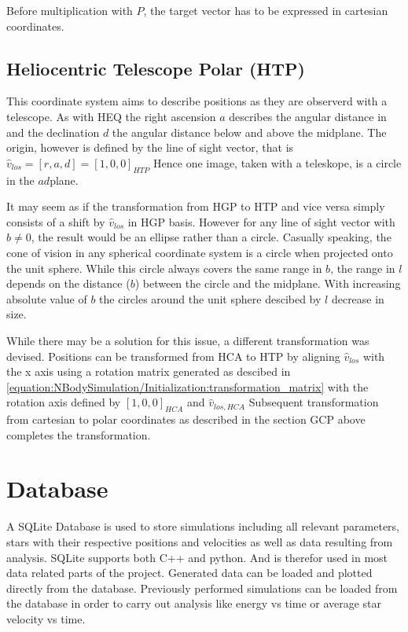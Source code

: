 \documentclass[letterpaper,10pt,english]{sphinxmanual}
\begin{document}
\sphinxAtStartPar
Before multiplication with \(P\), the target vector has to be expressed in cartesian coordinates.


\section{Heliocentric Telescope Polar (HTP)}
\label{\detokenize{NBodySimulation/CoordinateSystems:heliocentric-telescope-polar-htp}}
\sphinxAtStartPar
This coordinate system aims to describe positions as they are observerd with a telescope.
As with HEQ the right ascension \(a\) describes the angular distance in and the declination \(d\) the angular distance below and above the midplane.
The origin, however is defined by the line of sight vector, that is \(\hat{v}_{los} = [r,a,d] = [1,0,0]_{HTP}\)
Hence one image, taken with a teleskope, is a circle in the \(ad\)\sphinxhyphen{}plane.

\sphinxAtStartPar
It may seem as if the transformation from HGP to HTP and vice versa simply consists of a shift by \(\hat{v}_{los}\) in HGP basis.
However for any line of sight vector with \(b\neq0\), the result would be an ellipse rather than a circle.
Casually speaking, the cone of vision in any spherical coordinate system is a circle when projected onto the unit sphere.
While this circle always covers the same range in \(b\), the range in \(l\) depends on the distance (\(b\)) between the circle and the midplane.
With increasing absolute value of \(b\) the circles around the unit sphere descibed by \(l\) decrease in size.

\sphinxAtStartPar
While there may be a solution for this issue, a different transformation was devised.
Positions can be transformed from HCA to HTP by aligning \(\hat{v}_{los}\) with the x axis 
using a rotation matrix generated as descibed in \eqref{equation:NBodySimulation/Initialization:transformation_matrix} with the rotation axis defined by \([1,0,0]_{HCA}\) and \(\hat{v}_{los,HCA}\)
Subsequent transformation from cartesian to polar coordinates as described in the section GCP above completes the transformation.


\chapter{Database}
\label{\detokenize{NBodySimulation/Database:database}}\label{\detokenize{NBodySimulation/Database::doc}}
\sphinxAtStartPar
A SQLite Database is used to store simulations including all relevant parameters, stars with their respective positions and velocities as well as data resulting from analysis.
SQLite supports both C++ and python. And is therefor used in most data related parts of the project. Generated data can be loaded and plotted directly from the database.
Previously performed simulations can be loaded from the database in order to carry out analysis like energy vs time or average star velocity vs time.
\end{document}
